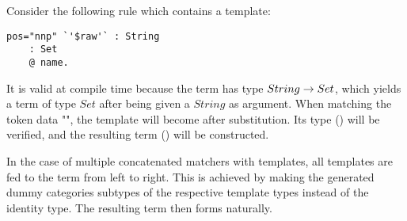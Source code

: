 \documentclass[main.tex]{subfiles}
\begin{document}
\begin{example}
Consider the following rule which contains a template:
\begin{lstlisting}
pos="nnp" `'$raw'` : String
    : Set
    @ name.
\end{lstlisting}
It is valid at compile time because the term  has type
$String \rightarrow Set$, which yields a term of type $Set$ after being given
a $String$ as argument.
When matching the token data "", the template
 will become
 after substitution. Its type
() will be verified, and the resulting term
() will be constructed.
\end{example}

In the case of multiple concatenated matchers with templates, all templates
are fed to the term from left to right. This is achieved by making the
generated dummy categories subtypes of the respective template types instead
of the identity type. The resulting term then forms naturally.
\end{document}
